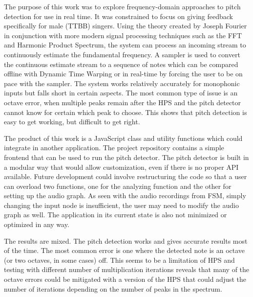 The purpose of this work was to explore frequency-domain approaches to pitch detection for use in real time. It was constrained to focus on giving feedback specifically for male (TTBB) singers. Using the theory created by Joseph Fourier in conjunction with more modern signal processing techniques such as the FFT and Harmonic Product Spectrum, the system can process an incoming stream to continuously estimate the fundamental frequency. A sampler is used to convert the continuous estimate stream to a sequence of notes which can be compared offline with Dynamic Time Warping or in real-time by forcing the user to be on pace with the sampler. The system works relatively accurately for monophonic inputs but falls short in certain aspects. The most common type of issue is an octave error, when multiple peaks remain after the HPS and the pitch detector cannot know for certain which peak to choose. This shows that pitch detection is easy to get working, but difficult to get right. 

The product of this work is a JavaScript class and utility functions which could integrate in another application. The project repository contains a simple frontend that can be used to run the pitch detector. The pitch detector is built in a modular way that would allow customization, even if there is no proper API available. Future development could involve restructuring the code so that a user can overload two functions, one for the analyzing function and the other for setting up the audio graph. As seen with the audio recordings from FSM, simply changing the input node is insufficient, the user may need to modify the audio graph as well. The application in its current state is also not minimized or optimized in any way.

The results are mixed. The pitch detection works and gives accurate results most of the time. The most common error is one where the detected note is an octave (or two octaves, in some cases) off. This seems to be a limitation of HPS and testing with different number of multiplication iterations reveals that many of the octave errors could be mitigated with a version of the HPS that could adjust the number of iterations depending on the number of peaks in the spectrum.